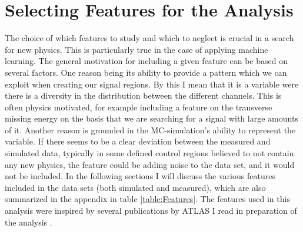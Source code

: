 \section{Selecting Features for the Analysis}\label{sec:Feats}
The choice of which features to study and which to neglect is crucial in a search for new physics. This is particularly true 
in the case of applying machine learning. The general motivation for including a given feature can be based on several factors. 
One reason being its ability to provide a pattern which we can exploit when creating our signal regions. By this I mean
that it is a variable were there is a diversity in the distribution between the different channels. This is often physics motivated, for example 
including a feature on the transverse missing energy on the basis that we are searching for a signal with large amounts of it. 
Another reason is grounded in the \ac{MC}-simulation's ability to represent the variable. If there seems to be a clear deviation between the 
measured and simulated data, typically in some defined control regions believed to not contain any new physics, the feature could be adding noise 
to the data set, and it would not be included. In the following sections I will discuss the various features included in the data sets (both simulated and measured), 
which are also summarized in the appendix in table \ref{table:Features}. The features used in this analysis were inspired by several publications by \ac{ATLAS} I read in 
preparation of the analysis \cite{franchini_search_2019, atlas_search_2021}.